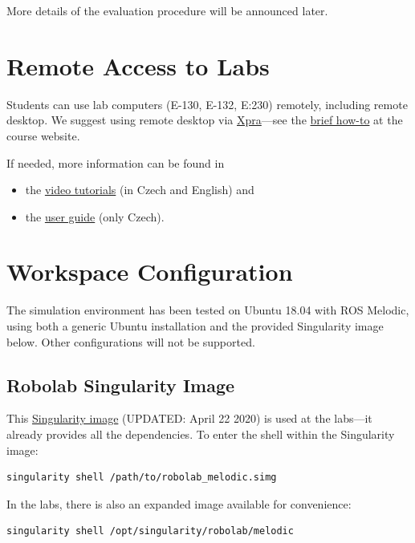 \documentclass[a4paper]{article}
\begin{document}
More details of the evaluation procedure will be announced later.

 
\section{Remote Access to Labs}

Students can use lab computers (E-130, E-132, E:230) remotely, including remote desktop.
We suggest using remote desktop via \href{https://xpra.org/}{Xpra}---see the \href{https://cw.fel.cvut.cz/b192/courses/aro/tutorials/remote_access}{brief how-to} at the course website.

If needed, more information can be found in
\begin{itemize}\itemsep0em
\item the \href{https://www.thewoodcraft.org/pub/hornilouka/videa/}{video tutorials} (in Czech and English) and
\item the \href{https://support.dce.felk.cvut.cz/mediawiki/index.php/Vzd%C3%A1len%C3%BD_p%C5%99%C3%ADstup_do_laborato%C5%99%C3%AD}{user guide} (only Czech).
\end{itemize}
 
\section{Workspace Configuration}

The simulation environment has been tested on Ubuntu 18.04 with ROS Melodic, using both a generic Ubuntu installation and the provided Singularity image below.
Other configurations will not be supported.

\subsection{Robolab Singularity Image}

This
\href{http://ptak.felk.cvut.cz/tradr/share/robolab_melodic.simg}{Singularity image} (UPDATED: April 22 2020)
is used at the labs---it already provides all the dependencies.
To enter the shell within the Singularity image:
\begin{verbatim}
singularity shell /path/to/robolab_melodic.simg
\end{verbatim}
In the labs, there is also an expanded image available for convenience:
\begin{verbatim}
singularity shell /opt/singularity/robolab/melodic
\end{verbatim}
\end{document}
